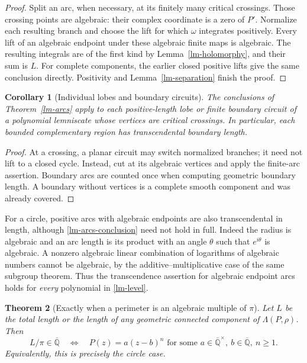 \documentclass[11pt,a4paper]{article}
\newtheorem{theorem}{Theorem}[section]
\newtheorem{corollary}[theorem]{Corollary}
\theoremstyle{definition}
\theoremstyle{remark}
\numberwithin{equation}{section}
\newcommand{\Qbar}{\overline{\mathbb Q}}
\begin{document}
\begin{proof}
Split an arc, when necessary, at its finitely many critical crossings.
Those crossing points are algebraic: their complex coordinate is a zero
of $P'$.  Normalize each resulting branch and choose the lift for which
$\omega$ integrates positively.  Every lift of an algebraic endpoint
under these algebraic finite maps is algebraic.  The resulting integrals
are of the first kind by Lemma~\ref{lm-holomorphy}, and their sum is $L$.
For complete components, the earlier closed positive lifts give the same
conclusion directly.  Positivity and Lemma~\ref{lm-separation} finish the
proof.
\end{proof}

\begin{corollary}[Individual lobes and boundary circuits]
\label{lm-lobes}
The conclusions of Theorem~\ref{lm-arcs} apply to each positive-length
lobe or finite boundary circuit of a polynomial lemniscate whose vertices
are critical crossings.  In particular, each bounded complementary
region has transcendental boundary length.
\end{corollary}

\begin{proof}
At a crossing, a planar circuit may switch normalized branches; it need
not lift to a closed cycle.  Instead, cut at its algebraic vertices and
apply the finite-arc assertion.  Boundary arcs are counted once when
computing geometric boundary length.  A boundary without vertices is a
complete smooth component and was already covered.
\end{proof}

For a circle, positive arcs with algebraic endpoints are also
transcendental in length, although \eqref{lm-arcs-conclusion} need not
hold in full.  Indeed the radius is algebraic and an arc length is its
product with an angle $\theta$ such that $e^{i\theta}$ is algebraic.
A nonzero algebraic linear combination of logarithms of algebraic
numbers cannot be algebraic, by the additive--multiplicative case of the
same subgroup theorem.  Thus the transcendence assertion for algebraic
endpoint arcs holds for \emph{every} polynomial in \eqref{lm-level}.

\begin{theorem}[Exactly when a perimeter is an algebraic multiple of $\pi$]
\label{lm-circle-dichotomy}
Let $L$ be the total length or the length of any geometric connected
component of $\Lambda(P,\rho)$.  Then
\[
 L/\pi\in\Qbar
 \quad\Longleftrightarrow\quad
 P(z)=a(z-b)^n\text{ for some }a\in\Qbar^\times,
 \ b\in\Qbar,\ n\ge1.
\]
Equivalently, this is precisely the circle case.
\end{theorem}
\end{document}
